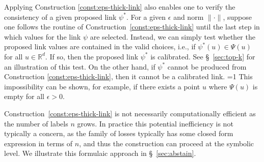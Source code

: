 \documentclass[twoside,11pt]{article}
\newcommand{\Comments}{1}
\newcommand{\CommentsR}{1}
\newcommand{\mytodo}[2]{\ifnum\Comments=1%
  \todo[linecolor=#1!80!black,backgroundcolor=#1,bordercolor=#1!80!black]{#2}\fi}
\newcommand{\reviewerresponse}[2]{\ifnum\CommentsR=1%
  \todo[linecolor=#1!80!black,backgroundcolor=#1,bordercolor=#1!80!black]{#2}\fi}
\newcommand{\raft}[1]{\mytodo{green!20!white}{RF: #1}}
\newcommand{\jessiet}[1]{\mytodo{teal!20!white}{JF: #1}}
\newcommand{\reviewertwo}[1]{\reviewerresponse{blue!20!white}{R2: #1}}
\newcommand{\reals}{\mathbb{R}}
\begin{document}
Applying Construction \ref{const:eps-thick-link} also enables one to verify the consistency of a given proposed link $\psi^*$.
For a given $\epsilon$ and norm $\|\cdot\|$, suppose one follows the routine of Construction~\ref{const:eps-thick-link} until the last step in which values for the link $\psi$ are selected.
Instead, we can simply test whether the proposed link values are contained in the valid choices, i.e., if $\psi^*(u) \in \Psi(u)$ for all $u\in\reals^d$.
If so, then the proposed link $\psi^*$ is calibrated.
See \S~\ref{sec:top-k} for an illustration of this test.
On the other hand, if $\psi^*$ cannot be produced from Construction \ref{const:eps-thick-link}, then it cannot be a calibrated link.
\reviewertwo{D}
This impossibility can be shown, for example, if there exists a point $u$ where $\Psi(u)$ is empty for all $\epsilon > 0$.

Construction~\ref{const:eps-thick-link} is not necessarily computationally efficient as the number of labels $n$ grows.
In practice this potential inefficiency is not typically a concern, as the family of losses typically has some closed form expression in terms of $n$, and thus the construction can proceed at the symbolic level.
We illustrate this formulaic approach in \S~\ref{sec:abstain}.
\end{document}
